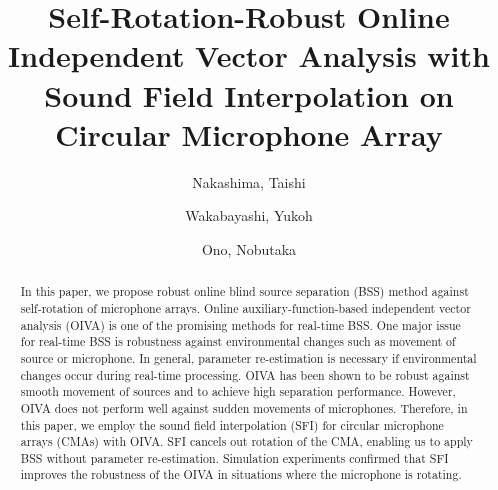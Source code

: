 \documentclass[sip,biber]{now-journal}
\title{Self-Rotation-Robust Online Independent Vector Analysis with\\Sound Field Interpolation on Circular Microphone Array}
\author{Nakashima, Taishi}
\affil{Tokyo Metropolitan University, Tokyo, Japan}
\author{Wakabayashi, Yukoh}
\affil{Toyohashi University of Technology, Aichi, Japan}
\author[1]{Ono, Nobutaka}
\begin{document}
\begin{abstract}
  In this paper, we propose robust online blind source separation (BSS) method against self-rotation of microphone arrays.
  Online auxiliary-function-based independent vector analysis (OIVA) is one of the promising methods for real-time BSS.
  One major issue for real-time BSS is robustness against environmental changes such as movement of source or microphone.
  In general, parameter re-estimation is necessary if environmental changes occur during real-time processing.
  OIVA has been shown to be robust against smooth movement of sources and to achieve high separation performance.
  However, OIVA does not perform well against sudden movements of microphones.
  Therefore, in this paper, we employ the sound field interpolation (SFI) for circular microphone arrays (CMAs) with OIVA.
  SFI cancels out rotation of the CMA, enabling us to apply BSS without parameter re-estimation.
  Simulation experiments confirmed that SFI improves the robustness of the OIVA in situations where the microphone is rotating.
\end{abstract}
\end{document}

